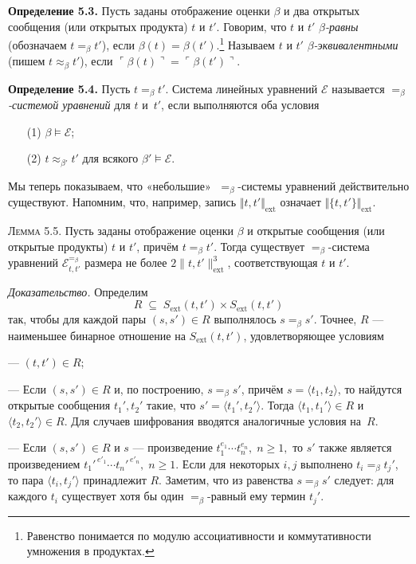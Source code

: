 \textbf{Определение 5.3.}
Пусть заданы отображение оценки $\beta$ и два открытых сообщения
(или открытых продукта) $t$ и $t'$.
Говорим, что $t$ и $t'$ \emph{$\beta$-равны}
(обозначаем $t =_{\beta} t'$), если $\beta(t)=\beta(t')$.\footnote{%
  Равенство понимается по модулю ассоциативности и коммутативности
  умножения в продуктах.}
Называем $t$ и $t'$ \emph{$\beta$-эквивалентными}
(пишем $t \approx_{\beta} t'$), если
\(
  \ulcorner\beta(t)\urcorner = \ulcorner\beta(t')\urcorner .
\)

\medskip
\textbf{Определение 5.4.}
Пусть $t =_{\beta} t'$.
Система линейных уравнений $\mathcal E$
называется \emph{$=_{\beta}$-системой уравнений} для $t$ и~$t'$,
если выполняются оба условия

\begin{enumerate}\itemsep0pt
\item[(1)] $\beta \models \mathcal E$;
\item[(2)] $t \approx_{\beta'} t'$ для всякого $\beta' \models \mathcal E$.
\end{enumerate}

Мы теперь показываем, что «небольшие» $\;=_{\beta}$-системы
уравнений действительно существуют.
Напомним, что, например, запись
$\Vert t,t'\Vert_{\text{ext}}$
означает $\Vert\!\{t,t'\}\!\Vert_{\text{ext}}$.

\textsc{Лемма 5.5.}
Пусть заданы отображение оценки $\beta$ и открытые сообщения
(или открытые продукты) $t$ и $t'$, причём $t =_{\beta} t'$.
Тогда существует $=_{\beta}$-система уравнений
$\mathcal E^{=_{\beta}}_{t,t'}$
размера не более $2\lVert t,t'\rVert_{\text{ext}}^{3}$,
соответствующая $t$ и $t'$.

\textit{Доказательство.}
Определим
\[
  R \;\subseteq\;
  S_{\text{ext}}(t,t')\times S_{\text{ext}}(t,t')
\]
так, чтобы для каждой пары $(s,s')\in R$ выполнялось $s =_{\beta} s'$.
Точнее, $R$ — наименьшее бинарное отношение на
$S_{\text{ext}}(t,t')$, удовлетворяющее условиям

— $(t,t')\in R$;  

— Если $(s,s')\in R$ и, по построению, $s =_{\beta} s'$, причём
  $s=\langle t_{1},t_{2}\rangle$, то найдутся открытые сообщения
  $t_{1}',t_{2}'$ такие, что $s'=\langle t_{1}',t_{2}'\rangle$.
  Тогда $\langle t_{1},t_{1}'\rangle\in R$ и
  $\langle t_{2},t_{2}'\rangle\in R$. Для случаев шифрования вводятся аналогичные условия на~$R$.

— Если $(s,s')\in R$ и $s$ — произведение
  $t_{1}^{e_{1}}\!\cdots t_{n}^{e_{n}},\; n\ge1,$
  то $s'$ также является произведением
  $t_{1}'^{\,e'_{1}}\!\cdots t_{n}'^{\,e'_{n}},\; n\ge1.$
  Если для некоторых $i,j$ выполнено $t_{i}=_{\beta}t_{j}'$,
  то пара $\langle t_{i},t_{j}'\rangle$ принадлежит $R$.
  Заметим, что из равенства $s =_{\beta} s'$ следует:
  для каждого $t_{i}$ существует хотя бы один
  $=_{\beta}$-равный ему термин $t_{j}'$.

